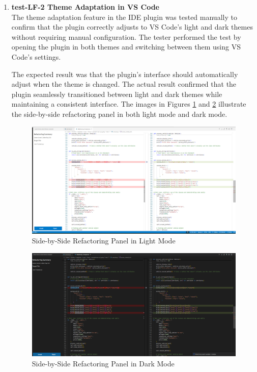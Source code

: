 \documentclass[12pt, titlepage]{article}
\begin{document}
\begin{enumerate}
  \item \textbf{test-LF-2 Theme Adaptation in VS Code} \\[2mm]
    The theme adaptation feature in the IDE plugin was tested
    manually to confirm that the plugin correctly adjusts to VS
    Code's light and dark themes without requiring manual
    configuration. The tester performed the test by opening the
    plugin in both themes and switching between them using VS Code's settings.

    The expected result was that the plugin's interface should
    automatically adjust when the theme is changed. The actual result
    confirmed that the plugin seamlessly transitioned between light
    and dark themes while maintaining a consistent interface. The
    images in Figures \ref{fig:lf2_light} and \ref{fig:lf2_dark}
    illustrate the side-by-side refactoring panel in both light mode
    and dark mode.

    \FloatBarrier
    \begin{figure}[h]
      \centering
      \includegraphics[width=0.8\linewidth]{../Images/test-LF-2-image-light.png}
      \caption{Side-by-Side Refactoring Panel in Light Mode}
      \label{fig:lf2_light}
    \end{figure}
    \FloatBarrier

    \FloatBarrier
    \begin{figure}[h]
      \centering
      \includegraphics[width=0.8\linewidth]{../Images/test-LF-2-image-dark.png}
      \caption{Side-by-Side Refactoring Panel in Dark Mode}
      \label{fig:lf2_dark}
    \end{figure}
    \FloatBarrier


\end{enumerate}
\end{document}
